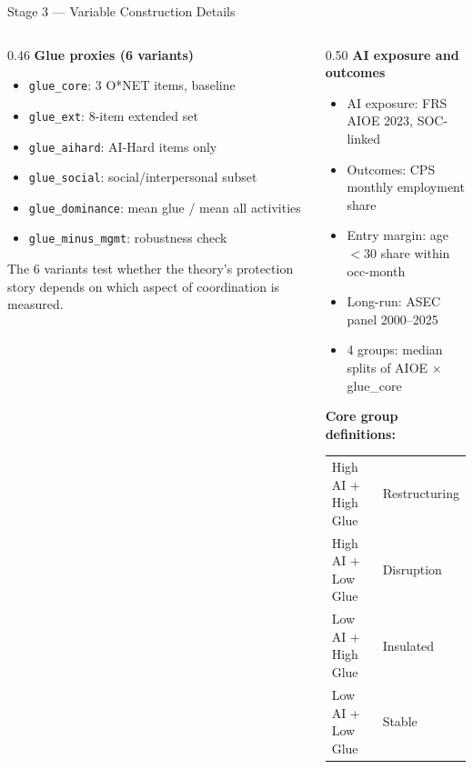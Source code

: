 \documentclass[10pt,english,aspectratio=169]{beamer}
\begin{document}
\begin{frame}{Stage 3 --- Variable Construction Details}
\begin{columns}[T]
\begin{column}{0.46\textwidth}
\textbf{Glue proxies (6 variants)}
\begin{itemize}\small
  \item \texttt{glue\_core}: 3 O*NET items, baseline
  \item \texttt{glue\_ext}: 8-item extended set
  \item \texttt{glue\_aihard}: AI-Hard items only
  \item \texttt{glue\_social}: social/interpersonal subset
  \item \texttt{glue\_dominance}: mean glue / mean all activities
  \item \texttt{glue\_minus\_mgmt}: robustness check
\end{itemize}
\vspace{0.2cm}
\footnotesize{The 6 variants test whether the theory's protection story depends on which aspect of coordination is measured.}
\end{column}
\begin{column}{0.50\textwidth}
\textbf{AI exposure and outcomes}
\begin{itemize}\small
  \item AI exposure: FRS AIOE 2023, SOC-linked
  \item Outcomes: CPS monthly employment share
  \item Entry margin: age $<30$ share within occ-month
  \item Long-run: ASEC panel 2000--2025
  \item 4 groups: median splits of AIOE $\times$ glue\_core
\end{itemize}
\vspace{0.2cm}
\textbf{Core group definitions:}

\small
\begin{tabular}{ll}
High AI + High Glue & Restructuring \\
High AI + Low Glue  & Disruption \\
Low AI + High Glue  & Insulated \\
Low AI + Low Glue   & Stable \\
\end{tabular}
\end{column}
\end{columns}
\end{frame}
\end{document}
